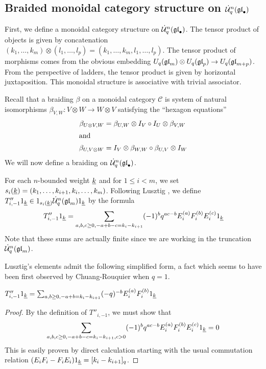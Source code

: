\documentclass[11pt]{amsart}
\begin{document}
\subsection{Braided monoidal category structure on $\dot{{\mathcal{U}}}_q^n({\mathfrak{gl}}_\bullet)$} \label{se:braiding}
First, we define a monoidal category structure on $\dot{{\mathcal{U}}}_q^n({\mathfrak{gl}}_\bullet)$.  The tensor product of objects is given by concatenation $(k_1, \dots, k_m) \otimes (l_1, \dots, l_p) = (k_1, \dots, k_m, l_1, \dots, l_p) $.  The tensor product of morphisms comes from the obvious embedding $ U_q({\mathfrak{gl}}_{m}) \otimes U_q({\mathfrak{gl}}_{p}) \rightarrow U_q({\mathfrak{gl}}_{m+p})$.  From the perspective of ladders, the tensor product is given by horizontal juxtaposition.  This monoidal structure is associative with trivial associator.

Recall that a braiding $\beta$ on a monoidal category $ \mathcal C$ is system of natural isomorphisms $\beta_{V, W} : V \otimes W \rightarrow W \otimes V $ satisfying the ``hexagon equations''
\begin{align} \label{eq:hex}
\beta_{U \otimes V, W} & = \beta_{U, W}  \otimes I_V \circ I_U \otimes \beta_{V, W} \\
\intertext{and}
\beta_{U, V \otimes W} & = I_V \otimes \beta_{W, W} \circ \beta_{U, V}  \otimes I_W \notag
\end{align}
We will now define a braiding on $ \dot{{\mathcal{U}}}_q^n({\mathfrak{gl}}_\bullet) $.

For each $n$-bounded weight $ {\underline{k}} $ and for $ 1 \le i < m $, we set $ s_i({\underline{k}}) = (k_1, \dots, k_{i+1}, k_i, \dots, k_m) $.  Following Lusztig \cite[5.2.1]{MR1227098}, we define $ T''_{i,-1} 1_{{\underline{k}}} \in 1_{s_i({\underline{k}})} \dot{{\mathcal{U}}}_q^n({\mathfrak{gl}}_m) 1_{{\underline{k}}} $ by the formula
\begin{equation}\label{eq:temp3}
T''_{i,-1} 1_{{\underline{k}}} = \sum_{a, b, c \ge 0, -a +b -c = k_i - k_{i+1}} (-1)^b q^{ac - b} E_i^{(a)} F_i^{(b)} E_i^{(c)} 1_{{\underline{k}}}
\end{equation}
Note that these sums are actually finite since we are working in the truncation $ \dot{{\mathcal{U}}}_q^n({\mathfrak{gl}}_m) $.


Lusztig's elements admit the following simplified form, a fact which seems to have been first observed by Chuang-Rouquier \cite{MR2373155} when $ q = 1 $.
\begin{lem} \label{le:singlesum}
$T''_{i,-1} 1_{{\underline{k}}} = \sum_{a, b \ge 0, -a +b = k_i - k_{i+1}} (-q)^{-b} E_i^{(a)} F_i^{(b)} 1_{{\underline{k}}} $
\end{lem}
\begin{proof}
By the definition of $ T''_{i,-1}$, we must show that 
$$\sum_{a, b, c \ge 0, -a +b -c = k_i - k_{i+1}, c > 0 } (-1)^b q^{ac - b} E_i^{(a)} F_i^{(b)} E_i^{(c)} 1_{{\underline{k}}} = 0 $$
This is easily proven by direct calculation starting with the usual commutation relation $ (E_i F_i - F_i E_i)1_{{\underline{k}}} = [k_i - k_{i+1}]_q $.
\end{proof}
\end{document}
